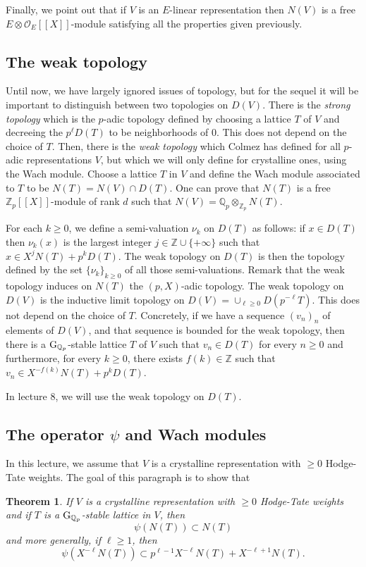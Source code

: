 \documentclass[11pt]{amsart}
\def\Z{{\mathbb Z}_p}
\def\Q{{\mathbb Q}_p}
\def\g{{\rm G}_{\Q}}
\def\O{{\mathcal O}_E}
\newtheorem{thm}[definit]{\bf{Theorem}}
\begin{document}
Finally, we point out that if $V$ is an $E$-linear representation then 
$N(V)$ is a free $E \otimes \O[[X]]$-module satisfying all the 
properties given previously. 
 
\subsection{The weak topology}\label{defweaktopo} 
Until now, we have largely ignored issues of topology, but for the 
sequel it will be important to distinguish between two topologies on 
$D(V)$. There is the \emph{strong topology} which is the $p$-adic 
topology defined by choosing a lattice $T$ of $V$ and decreeing the 
$p^{\ell} D(T)$ to be neighborhoods of $0$. This does not depend on 
the choice of $T$. Then, there is the \emph{weak topology} which 
Colmez has defined for all $p$-adic representations $V$, but which we 
will only define for crystalline ones, using the Wach module. Choose a 
lattice $T$ in $V$ and define the Wach module associated to $T$ to be 
$N(T) = N(V) \cap D(T)$. One can prove that $N(T)$ is a free 
$\Z[[X]]$-module of rank $d$ such that $N(V) = \Q \otimes_{\Z} N(T)$.  
 
For each $k \geq 0$, we define a semi-valuation 
$\nu_k$ on $D(T)$ as follows: if $x \in D(T)$ then $\nu_k(x)$ is 
the largest integer $j \in \mathbb{Z} \cup \{ + \infty\}$  
such that $x \in X^j N(T) + p^k D(T)$. The weak topology on $D(T)$ is 
then the topology defined by the set $\{\nu_k\}_{k \geq 0}$ of all 
those semi-valuations. 
Remark that the weak topology induces on $N(T)$ the $(p,X)$-adic 
topology. The weak  
topology on $D(V)$ is the inductive 
limit topology on $D(V) = \cup_{\ell \geq 0} D(p^{-\ell}T)$.  
This does not depend on the choice of $T$. Concretely, if we  
have a sequence $(v_n)_n$ of elements of $D(V)$, and 
that sequence is bounded for the weak topology, then there is a 
$\g$-stable lattice $T$ of $V$ such that $v_n \in D(T)$ for every $n \geq 
0$ and furthermore, for every $k \geq 0$, there exists $f(k) \in 
\mathbb{Z}$ such that $v_n \in X^{-f(k)} N(T) + p^k D(T)$.  
 
In lecture 8, we will use the weak topology on $D(T)$.  
 
\subsection{The operator $\psi$ and Wach modules}\label{wachpsi} 
In this lecture, we assume that $V$ is a crystalline representation 
with $\geq 0$ Hodge-Tate weights. The goal of this paragraph is to 
show that   
\begin{thm}\label{psionwach} 
If $V$ is a crystalline representation 
with $\geq 0$ Hodge-Tate weights 
and if $T$ is a $\g$-stable lattice in $V$, then 
\[ \psi(N(T)) \subset N(T) \] and more generally, if 
$\ell \geq 1$, then \[ \psi(X^{-\ell} N(T)) \subset p^{\ell-1}  
X^{-\ell} N(T) + X^{-\ell+1} N(T). \] 
\end{thm} 
 
\end{document}
